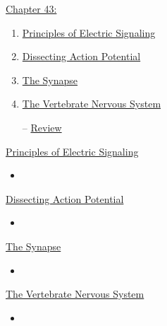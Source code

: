 \documentclass[12pt,letterpaper]{article}
\newcommand{\thetitle}{\hypertarget{home}{Animals and Ecology}}
\begin{document}

\clearpage

\renewcommand{\thetitle}{\hypertarget{43}{}}
\hypertarget{43}{}
\setcounter{section}{43}

\begin{chapbox}{\hyperlink{home}{Chapter 43:}}
    \begin{enumerate}
        \item \hyperlink{43.1}{Principles of Electric Signaling}
        \item \hyperlink{43.2}{Dissecting Action Potential}
        \item \hyperlink{43.3}{The Synapse}
        \item \hyperlink{43.4}{The Vertebrate Nervous System}
        \item [--] \hyperlink{43.r}{Review}
    \end{enumerate}
\end{chapbox}

\hypertarget{43.1}{}
\begin{secbox}{\hyperlink{43}{Principles of Electric Signaling}}{
    \begin{itemize}
        \item
    \end{itemize}
}\end{secbox}

\hypertarget{43.2}{}
\begin{secbox}{\hyperlink{43}{Dissecting Action Potential}}{
    \begin{itemize}
        \item
    \end{itemize}
}\end{secbox}

\hypertarget{43.3}{}
\begin{secbox}{\hyperlink{43}{The Synapse}}{
    \begin{itemize}
        \item
    \end{itemize}
}\end{secbox}

\hypertarget{43.4}{}
\begin{secbox}{\hyperlink{43}{The Vertebrate Nervous System}}{
    \begin{itemize}
        \item
    \end{itemize}
}\end{secbox}
\end{document}
